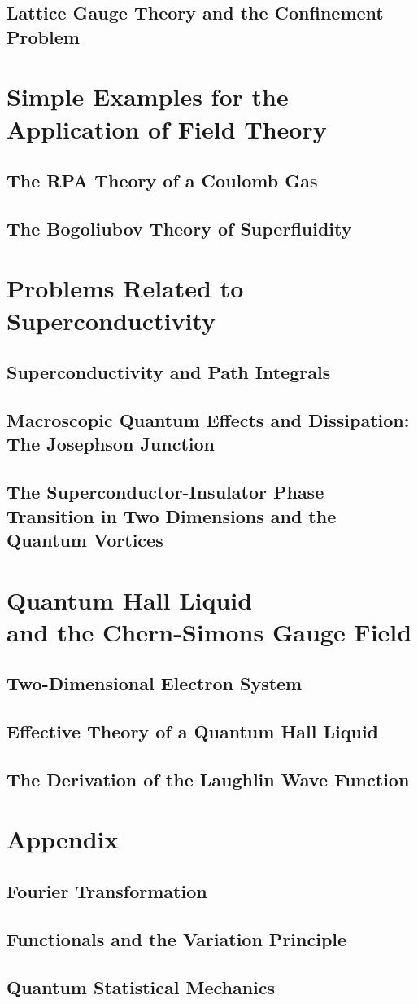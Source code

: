 \documentclass[twoside,11pt]{report}
\begin{document}
\section{Lattice Gauge Theory and the Confinement Problem}
\chapter{Simple Examples for the Application of Field Theory}
\section{The RPA Theory of a Coulomb Gas}
\section{The Bogoliubov Theory of Superfluidity}
\chapter{Problems Related to Superconductivity}\label{chap5}
\section{Superconductivity and Path Integrals}
\section{Macroscopic Quantum Effects and Dissipation: The Josephson Junction}
\section{The Superconductor-Insulator Phase Transition in Two Dimensions and the Quantum Vortices}
\chapter{Quantum Hall Liquid\\ and the Chern-Simons Gauge Field}
\section{Two-Dimensional Electron System}
\section{Effective Theory of a Quantum Hall Liquid}
\section{The Derivation of the Laughlin Wave Function}
\appendix
\chapter{Appendix}
\section{Fourier Transformation}
\section{Functionals and the Variation Principle}\label{secapb}
\section{Quantum Statistical Mechanics}


\renewcommand{\bibname}{References}


\end{document}

